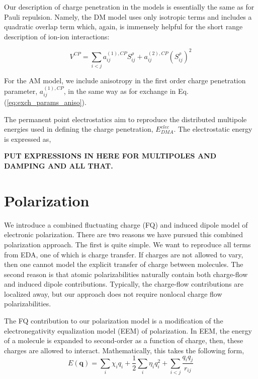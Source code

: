 \documentclass[journal=jacsat,manuscript=article]{achemso}
\begin{document}
Our description of charge penetration in the models is essentially
the same as for Pauli repulsion. Namely, the DM model uses only
isotropic terms and includes a quadratic overlap term which, again,
is immensely helpful for the short range description of ion-ion interactions:

\begin{equation}
  V^{CP} = \sum_{i<j}a_{ij}^{(1),CP}S_{ij}^\rho+a_{ij}^{(2),CP}(S_{ij}^\rho)^2
  \label{eq:exch_iso}
\end{equation}

For the AM model, we include anisotropy in the first order charge penetration
parameter, $a_{ij}^{(1),CP}$, in the same way as for exchange in Eq. (\ref{eq:exch_params_aniso}).

The permanent point electrostatics aim to reproduce the distributed
multipole energies used in defining the charge penetration, $E^{elec}_{DMA}$.
The electrostatic energy is expressed as,

\textbf{PUT EXPRESSIONS IN HERE FOR MULTIPOLES AND DAMPING AND ALL THAT.}

\section*{Polarization}

We introduce a combined fluctuating charge (FQ) and induced dipole model of electronic
polarization. There are two reasons we have pursued this combined polarization
approach. The first is quite simple. We want to reproduce all terms from EDA,
one of which is charge transfer. If charges are not allowed to vary, then one
cannot model the explicit transfer of charge between molecules. The second reason is
that atomic polarizabilities naturally contain both charge-flow and induced dipole
contributions.\cite{stone1985distributedb} Typically, the charge-flow contributions
are localized away\cite{ruth1994localization}, but our approach does not require nonlocal
charge flow polarizabilities.

The FQ contribution to our polarization model is a modification of the electronegativity
equalization model (EEM) of polarization.\cite{mortier1986electronegativity} In EEM,
the energy of a molecule is expanded to second-order as a function of charge, then,
these charges are allowed to interact. Mathematically, this takes the following form,
\begin{equation}
  E(\bm{q})=\sum_i \chi_i q_i + \frac12 \sum_i \eta_i q_i^2 + \sum_{i<j} \frac{q_i q_j}{r_{ij}}
  \label{eq:eem}
\end{equation}
\end{document}
